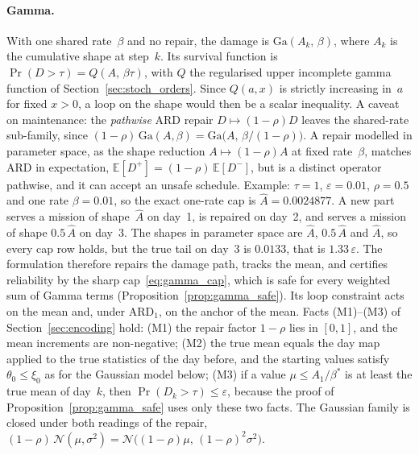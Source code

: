 \documentclass[11pt,a4paper]{article}
\theoremstyle{plain}
\theoremstyle{definition}
\theoremstyle{remark}
\begin{document}
\paragraph{Gamma.}
With one shared rate~$\beta$ and no repair, the damage is $\mathrm{Ga}(A_k,\,\beta)$, where $A_k$ is the cumulative shape at step~$k$.
Its survival function is $\Pr(D > \tau) = Q(A,\,\beta\tau)$, with $Q$ the regularised upper incomplete gamma function of Section~\ref{sec:stoch_orders}.
Since $Q(a,x)$ is strictly increasing in~$a$ for fixed $x > 0$, a loop on the shape would then be a scalar inequality.
A caveat on maintenance: the \emph{pathwise} ARD repair $D \mapsto (1-\rho)D$ leaves the shared-rate sub-family, since $(1-\rho)\,\mathrm{Ga}(A,\beta) = \mathrm{Ga}\bigl(A,\,\beta/(1-\rho)\bigr)$.
A repair modelled in parameter space, as the shape reduction $A \mapsto (1-\rho)A$ at fixed rate~$\beta$, matches ARD in expectation, $\mathbb{E}[D^+] = (1-\rho)\,\mathbb{E}[D^-]$, but is a distinct operator pathwise, and it can accept an unsafe schedule.
Example: $\tau = 1$, $\varepsilon = 0.01$, $\rho = 0.5$ and one rate $\beta = 0.01$, so the exact one-rate cap is $\hat A = 0.0024877$.
A new part serves a mission of shape~$\hat A$ on day~1, is repaired on day~2, and serves a mission of shape $0.5\,\hat A$ on day~3.
The shapes in parameter space are $\hat A$, $0.5\,\hat A$ and $\hat A$, so every cap row holds, but the true tail on day~3 is $0.0133$, that is $1.33\,\varepsilon$.
The formulation therefore repairs the damage path, tracks the mean, and certifies reliability by the sharp cap~\eqref{eq:gamma_cap}, which is safe for every weighted sum of Gamma terms (Proposition~\ref{prop:gamma_safe}).
Its loop constraint acts on the mean and, under $\text{ARD}_1$, on the anchor of the mean.
Facts (M1)--(M3) of Section~\ref{sec:encoding} hold: (M1) the repair factor $1-\rho$ lies in $[0, 1]$, and the mean increments are non-negative; (M2) the true mean equals the day map applied to the true statistics of the day before, and the starting values satisfy $\theta_0 \le \xi_0$ as for the Gaussian model below; (M3) if a value $\mu \le A_1/\beta^*$ is at least the true mean of day~$k$, then $\Pr(D_k > \tau) \le \varepsilon$, because the proof of Proposition~\ref{prop:gamma_safe} uses only these two facts.
The Gaussian family is closed under both readings of the repair, $(1-\rho)\,\mathcal{N}(\mu,\sigma^2) = \mathcal{N}\bigl((1-\rho)\mu,\,(1-\rho)^2\sigma^2\bigr)$.
\end{document}
